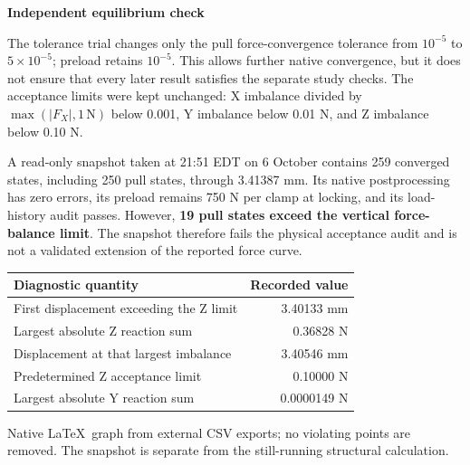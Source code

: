 \documentclass[10pt,a4paper]{article}
\newcommand{\PageTitle}[1]{{\LARGE\bfseries\color{Navy}#1\par}\vspace{7pt}}
\begin{document}
\clearpage
\PageTitle{Independent equilibrium check}
The tolerance trial changes only the pull force-convergence tolerance from $10^{-5}$ to $5\times10^{-5}$; preload retains $10^{-5}$. This allows further native convergence, but it does not ensure that every later result satisfies the separate study checks. The acceptance limits were kept unchanged: X imbalance divided by $\max(|F_X|,1\,\mathrm{N})$ below 0.001, Y imbalance below 0.01 N, and Z imbalance below 0.10 N.

A read-only snapshot taken at 21:51 EDT on 6 October contains 259 converged states, including 250 pull states, through 3.41387 mm. Its native postprocessing has zero errors, its preload remains 750 N per clamp at locking, and its load-history audit passes. However, \textbf{19 pull states exceed the vertical force-balance limit}. The snapshot therefore fails the physical acceptance audit and is not a validated extension of the reported force curve.

\begin{center}
\begin{tabular}{p{.64\linewidth}r}\toprule
Diagnostic quantity & Recorded value\\\midrule
First displacement exceeding the Z limit & 3.40133 mm\\
Largest absolute Z reaction sum & 0.36828 N\\
Displacement at that largest imbalance & 3.40546 mm\\
Predetermined Z acceptance limit & 0.10000 N\\
Largest absolute Y reaction sum & 0.0000149 N\\\bottomrule
\end{tabular}
\end{center}

\begin{center}
\end{center}
{\small Native \LaTeX\ graph from external CSV exports; no violating points are removed. The snapshot is separate from the still-running structural calculation.}
\end{document}
